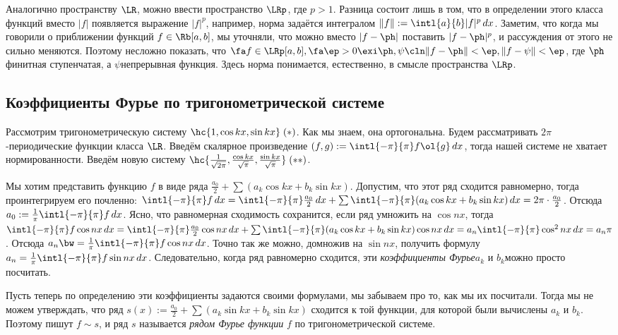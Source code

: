 \documentclass[a4paper]{article}
\newcommand{\intlab}{\intl{a}{b}}
\newcommand{\intlpp}{\intl{-\pi}{\pi}}
\newcommand{\frpi}{\frac{1}{\pi}}
\begin{document}
Аналогично пространству $\LR$, можно ввести пространство $\LRp$, где $p > 1$. Разница состоит лишь
в том, что в определении этого класса функций вместо $|f|$ появляется выражение $|f|^p$, например,
норма задаётся интегралом $\|f\| := \intlab |f|^p\,d x$. Заметим, что когда мы говорили о
приближении функций $f \in\Rb[a,b]$, мы уточняли, что можно вместо $|f - \ph|$ поставить $|f -
\ph|^p$, и рассуждения от этого не сильно меняются. Поэтому несложно показать, что $\fa f \in
\LRp[a,b], \fa \ep > 0 \exi \ph, \psi\cln \|f-\ph\|< \ep, \|f - \psi\| < \ep$, где $\ph$\т финитная
ступенчатая, а $\psi$\т непрерывная функция. Здесь норма понимается, естественно, в смысле
пространства $\LRp$.

\subsection{Коэффициенты Фурье по тригонометрической системе}

Рассмотрим тригонометрическую систему $\hc{1, \cos kx, \sin kx}\; (*)$. Как мы знаем, она
ортогональна. Будем рассматривать $2\pi$-периодические функции класса $\LR$. Введём скалярное
произведение $(f,g) := \intlpp f\ol{g} \,d x$, тогда нашей системе не хватает нормированности.
Введём новую систему $\hc{\frac{1}{\sqrt{2\pi}}, \frac{\cos kx}{\sqrt{\pi}}, \frac{\sin
kx}{\sqrt{\pi}}} \;(**)$.

Мы хотим представить функцию $f$ в виде ряда $\frac{a_0}{2} + \sum(a_k \cos kx + b_k \sin kx)$.
Допустим, что этот ряд сходится равномерно, тогда проинтегрируем его почленно: $\intlpp f \,d x =
\intlpp \frac{a_0}{2}\,d x + \sum \intlpp (a_k\cos kx + b_k \sin kx) \,d x = 2\pi\cdot
\frac{a_0}{2}$. Отсюда $a_0 := \frpi \intlpp f \,d x$. Ясно, что равномерная сходимость
сохранится, если ряд умножить на $\cos nx$, тогда $\intlpp f \cos nx \,d x = \intlpp
\frac{a_0}{2}\cos nx \,d x + \sum \intlpp (a_k \cos kx + b_k \sin kx)\cos nx \,d x = a_n \intlpp
\cos^2 n x \,d x = a_n \pi$. Отсюда $a_n \bw= \frpi \intlpp f \cos nx \,d x$. Точно так же можно,
домножив на $\sin nx$, получить формулу $a_n = \frpi \intlpp f \sin nx \,d x$. Следовательно,
когда ряд равномерно сходится, эти \emph{коэффициенты Фурье}\т $a_k$ и $b_k$\т можно просто
посчитать.

Пусть теперь по определению эти коэффициенты задаются своими формулами,  мы забываем про то, как мы их посчитали. Тогда мы не можем утверждать,
что ряд $s(x) := \frac{a_0}{2} + \sum (a_k \sin kx + b_k \sin kx)$ сходится к той функции, для которой были вычислены $a_k$ и $b_k$. Поэтому
пишут $f \sim s$, и ряд $s$ называется \emph{рядом Фурье функции} $f$ по тригонометрической системе.
\end{document}
